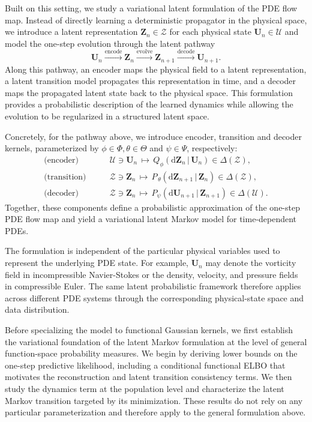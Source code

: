 \documentclass[11pt]{article}
\renewcommand{\d}{\mathrm{d}}
\begin{document}
Built on this setting, we study a variational latent formulation of the PDE flow map. Instead of directly learning a deterministic propagator in the physical space, we introduce a latent representation $\mathbf{Z}_n\in \mathcal Z$ for each physical state $\mathbf{U}_n\in \mathcal U$ and model the one-step evolution through the latent pathway
\begin{equation*}
    \mathbf{U}_n\xrightarrow{\text{encode}}
    \mathbf{Z}_n\xrightarrow{\text{evolve}}
    \mathbf{Z}_{n+1}\xrightarrow{\text{decode}}
    \mathbf{U}_{n+1}.
\end{equation*}
Along this pathway, an encoder maps the physical field to a latent representation, a latent transition model propagates this representation in time, and a decoder maps the propagated latent state back to the physical space. This formulation provides a probabilistic description of the learned dynamics while allowing the evolution to be regularized in a structured latent space.

Concretely, for the pathway above, we introduce encoder, transition and decoder kernels, parameterized by $\phi\in\Phi,\theta\in\Theta$ and $\psi\in\Psi$, respectively:
\begin{equation*}
\begin{aligned}
\text{(encoder)}\qquad &\mathcal{U}\ni\mathbf{U}_n\,\mapsto \,Q_\phi(\d\mathbf{Z}_n \,|\, \mathbf{U}_n)\in\Delta\left(\mathcal{Z}\right),\\
\text{(transition)}\qquad &\mathcal{Z}\ni\mathbf{Z}_n\,\mapsto\, P_{\,\theta}(\d\mathbf{Z}_{n+1} \,|\, \mathbf{Z}_n)\in\Delta(\mathcal{Z}),\\
\text{(decoder)}\qquad &\mathcal{Z}\ni\mathbf{Z}_n\,\mapsto \,P_\psi(\d\mathbf{U}_{n+1}\,|\, \mathbf{Z}_{n+1})\in\Delta(\mathcal{U}).
\end{aligned}
\end{equation*}
Together, these components define a probabilistic approximation of the one-step PDE flow map and yield a variational latent Markov model for time-dependent PDEs.

The formulation is independent of the particular physical variables used to represent the underlying PDE state. For example, $\mathbf U_n$ may denote the vorticity field in incompressible Navier-Stokes or the density, velocity, and pressure fields in compressible Euler. The same latent probabilistic framework therefore applies across different PDE systems through the corresponding physical-state space and data distribution.

Before specializing the model to functional Gaussian kernels, we first establish the variational foundation of the latent Markov formulation at the level of general function-space probability measures. We begin by deriving lower bounds on the one-step predictive likelihood, including a conditional functional ELBO that motivates the reconstruction and latent transition consistency terms. We then study the dynamics term at the population level and characterize the latent Markov transition targeted by its minimization. These results do not rely on any particular parameterization and therefore apply to the general formulation above.
\end{document}
